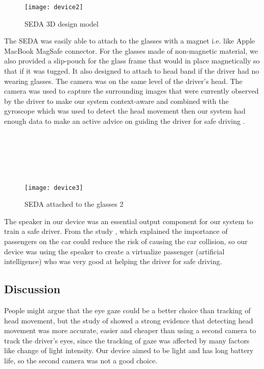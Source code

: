 \documentclass[main.tex]{subfiles}
\begin{document}
\begin{figure}
\caption{SEDA 3D design model}
\centering
\texttt{[image: device2]}
\end{figure}

The SEDA was easily able to attach to the glasses with a magnet i.e. like Apple MacBook MagSafe connector. For the glasses made of non-magnetic material, we also provided a slip-pouch for the glass frame that would in place magnetically so that if it was tugged. It also designed to attach to head band if the driver had no wearing glasses. The camera was on the same level of the driver’s head. The camera was used to capture the surrounding images that were currently observed by the driver to make our system context-aware and combined with the gyroscope which was used to detect the head movement then our system had enough data to make an active advice on guiding the driver for safe driving \cite{murphy2010head, doshi2009roles}. 
\\
\\
\\
\\
\\
\\

\begin{figure}
\caption{SEDA attached to the glasses 2}
\centering
\texttt{[image: device3]}
\end{figure}

The speaker in our device was an essential output component for our system to train a safe driver. From the study \cite{rueda2004influence}, which explained the importance of passengers on the car could reduce the risk of causing the car collision, so our device was using the speaker to create a virtualize passenger (artificial intelligence) who was very good at helping the driver for safe driving.

\subsection{Discussion}

People might argue that the eye gaze could be a better choice than tracking of head movement, but the study of \cite{doshi2009roles} showed a strong evidence that detecting head movement was more accurate, easier and cheaper than using a second camera to track the driver’s eyes, since the tracking of gaze was affected by many factors like change of light intensity. Our device aimed to be light and has long battery life, so the second camera was not a good choice.
\end{document}
